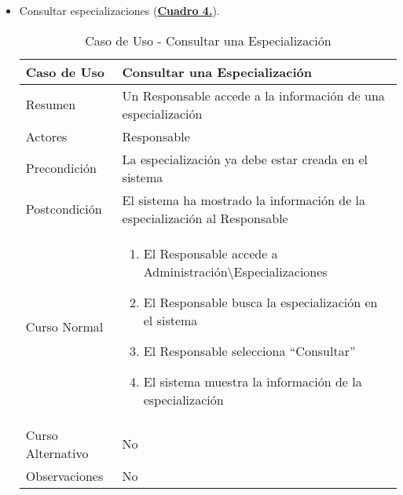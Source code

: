 \begin{itemize}
  \pagebreak
	\item \addtocounter{tabla}{1} Consultar especializaciones (\textbf{\hyperref[tab:curConsultarEspec]{Cuadro 4.}}).
		\begin{table}[!htbp]
		  \centering  \addtocounter{casouso}{1}
		  \begin{tabular}{|l | p{100mm}|}
		    \textbf{Caso de Uso}  & \textbf{Consultar una Especialización} \\ \hline
		    Resumen 		 & Un Responsable accede a la información de una especialización \\ \hline
		    Actores  		 & Responsable \\ \hline
		    Precondición  	 & La especialización ya debe estar creada en el sistema  \\ \hline
		    Postcondición  	 & El sistema ha mostrado la información de la especialización al Responsable \\ \hline
		    Curso Normal   	 & \begin{enumerate}
			  \item El Responsable accede a Administración\textbackslash Especializaciones
			  \item El Responsable busca la especialización en el sistema
			  \item El Responsable selecciona ``Consultar''
			  \item El sistema muestra la información de la especialización
		    \end{enumerate}  \\ \hline
		    Curso Alternativo  & No  \\ \hline
		    Observaciones 	 & No  \\ \hline
		  \end{tabular}
		  \caption{Caso de Uso  - Consultar una Especialización}
		  \label{tab:curConsultarEspec}
		\end{table}
		\FloatBarrier


\end{itemize}
